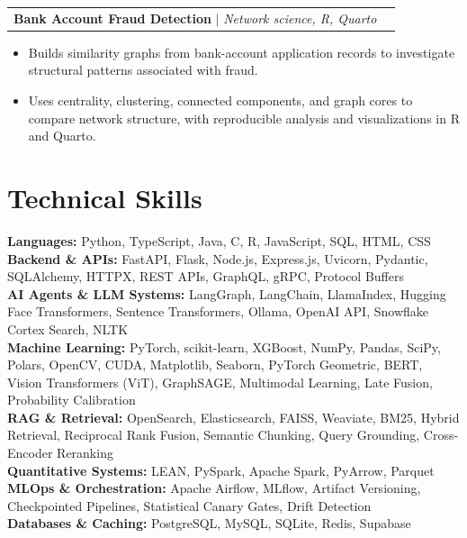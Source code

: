 \documentclass[letterpaper,11pt]{article}
\makeatletter
\newcommand{\resumeItem}[1]{
  \item\small{
    {#1 \vspace{-2pt}}
  }
}
\newcommand{\resumeProjectHeading}[2]{
    \item
    \begin{tabular*}{1.001\textwidth}{l@{\extracolsep{\fill}}r}
      \small#1 & \textbf{\small #2}\\
    \end{tabular*}\vspace{-7pt}
}
\newcommand{\resumeItemListStart}{\begin{itemize}}
\newcommand{\resumeItemListEnd}{\end{itemize}\vspace{-5pt}}
\makeatother
\begin{document}
\resumeProjectHeading
  {\textbf{Bank Account Fraud Detection} $|$ \emph{Network science, R, Quarto}}{}
\resumeItemListStart
  \resumeItem{Builds similarity graphs from bank-account application records to investigate structural patterns associated with fraud.}
  \resumeItem{Uses centrality, clustering, connected components, and graph cores to compare network structure, with reproducible analysis and visualizations in R and Quarto.}
\resumeItemListEnd
\vspace{-15pt}

\section{Technical Skills}
 \begin{itemize}[leftmargin=0.15in, label={}]
    \small{\item{
\textbf{Languages:} Python, TypeScript, Java, C, R, JavaScript, SQL, HTML, CSS \\

\textbf{Backend \& APIs:} FastAPI, Flask, Node.js, Express.js, Uvicorn,
Pydantic, SQLAlchemy, HTTPX, REST APIs, GraphQL, gRPC, Protocol Buffers \\

\textbf{AI Agents \& LLM Systems:} LangGraph, LangChain, LlamaIndex,
Hugging Face Transformers, Sentence Transformers, Ollama, OpenAI API,
Snowflake Cortex Search, NLTK \\

\textbf{Machine Learning:} PyTorch, scikit-learn, XGBoost, NumPy, Pandas,
SciPy, Polars, OpenCV, CUDA, Matplotlib, Seaborn, PyTorch Geometric, BERT, Vision Transformers (ViT), GraphSAGE,
Multimodal Learning, Late Fusion, Probability Calibration\\

\textbf{RAG \& Retrieval:} OpenSearch, Elasticsearch, FAISS, Weaviate,
BM25, Hybrid Retrieval, Reciprocal Rank Fusion, Semantic Chunking,
Query Grounding, Cross-Encoder Reranking \\

\textbf{Quantitative Systems:} LEAN, PySpark,
Apache Spark, PyArrow, Parquet  \\

\textbf{MLOps \& Orchestration:} Apache Airflow, MLflow,
Artifact Versioning, Checkpointed Pipelines, Statistical Canary Gates,
Drift Detection \\

\textbf{Databases \& Caching:} PostgreSQL, MySQL, SQLite, Redis, Supabase \\

}}
\end{itemize}
\end{document}
